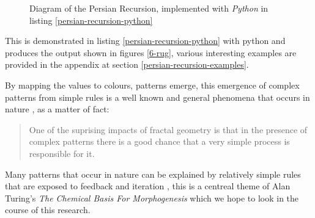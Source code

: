 \documentclass[11pt]{article}
\begin{document}
\begin{figure}[htbp]
\centering

\caption{\label{persian-recursion-diagram}Diagram of the Persian Recursion, implemented with \emph{Python} in listing \ref{persian-recursion-python}}
\end{figure}

This is demonstrated in listing \ref{persian-recursion-python} with python and produces the output shown in figures \ref{6-rug}, various interesting examples are provided in the appendix at section \ref{persian-recursion-examples}.

By mapping the values to colours, patterns emerge, this emergence of complex
patterns from simple rules is a well known and general phenomena that occurs in nature
\cite{EmergenceHowStupid2017,kivelsonDefiningEmergencePhysics2016}, as a matter of fact:

\begin{quote}
One of the suprising impacts of fractal geometry is that in the presence of
complex patterns there is a good chance that a very simple process is
responsible for it.
\end{quote}


Many patterns that occur in nature can be explained by relatively simple rules
that are exposed to feedback and iteration
\cite[p. 16]{peitgenChaosFractalsNew2004}, this is a centreal theme of Alan
Turing's \emph{The Chemical Basis For Morphogenesis}
\cite{turingChemicalBasisMorphogenesis1952} which we hope to look in the course of
this research.
\end{document}
